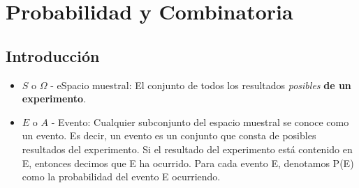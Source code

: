 \section{Probabilidad y Combinatoria}
\subsection{Introducción}
\begin{itemize}
\item  $S$ o $\Omega$ - eSpacio muestral: El conjunto de todos los resultados \textit{posibles} \textbf{de un experimento}.

\item $E$ o $A$ - Evento: Cualquier subconjunto del espacio muestral se conoce como un evento. Es decir, un evento es un conjunto que consta de posibles resultados del experimento. Si el resultado del experimento está contenido en E, entonces decimos que E ha ocurrido.
Para cada evento E, denotamos P(E) como la probabilidad del evento E ocurriendo.
\end{itemize}


